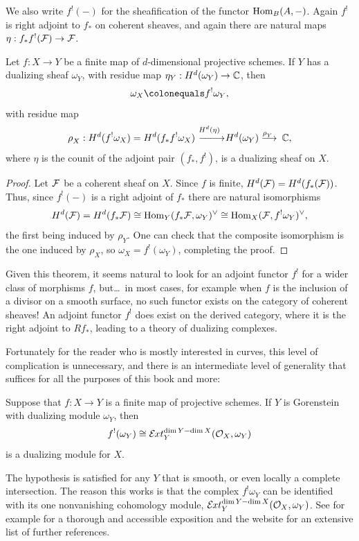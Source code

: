 We also write $f^{!}(-)$ for the sheafification of the functor
$\operatorname{Hom}_{B}(A,-)$. Again $f^{!}$ is right adjoint to $f_{*}$ on coherent
sheaves,
and again there are natural maps $\eta:f_{*}f^{!}({\mathcal F}) \to{\mathcal F}$.

\begin{theorem}\label{canonical as Hom}
\!Let $f{:}X{\to}Y$ be a finite map of $d$-dimensional projective schemes.
If $Y$ has a dualizing sheaf $\omega_{Y}$,
with residue map $\eta_{Y}: H^{d}(\omega_{Y}) \to {\mathbb C}$,
then
$$
\omega_{X} \colonequals f^{!}\omega_{Y},
$$
with residue map
$$
\rho^{}_{X}: H^{d}(f^{!}\omega_{X}) = H^{d}(f_{*}f^{!}\omega_{X}) \,\ruuto
{\!\!H^{d}(\eta)} H^{d}(\omega_{Y}) \ruto {\!\rho^{}_{Y}} \CC,
$$
where $\eta$ is the counit of the adjoint pair $(f_{*},f^{!})$, is a
dualizing sheaf on $X$.
\unif
\end{theorem}

\begin{proof}
Let ${\mathcal F}$ be a coherent sheaf on $X$. Since $f$ is finite,
$H^{d}({\mathcal F}) = H^{d}(f_{*}({\mathcal F}))$. Thus,
since $f^{!}(-)$ is a right adjoint of $f_{*}$ there are natural
isomorphisms
$$
H^{d}({\mathcal F}) = H^{d}(f_{*}{\mathcal F})
\cong
\operatorname{Hom}_{Y}(f_{*}{\mathcal F}, \omega_{Y})^{\vee} \cong
\operatorname{Hom}_{X}({\mathcal F}, f^{!}\omega_{Y})^{\vee},
$$
the first being
induced by $\rho^{}_{Y}$. One
can check that the composite
isomorphism is the one induced by $\rho^{}_{X}$, so $\omega_X =
f^{!}(\omega_{Y})$, completing the proof.
\end{proof}

\begin{fact}
Given this theorem, it seems natural to look for an adjoint functor
$f^{!}$ for a wider class of morphisms
$f$, but\dots\ in most cases, for example when $f$ is the inclusion of a
divisor on a smooth surface, no such functor exists on the category of
coherent sheaves!
An adjoint functor
$f^{!}$ does exist on the derived category, where it is the right adjoint
to $Rf_{*}$, leading to a theory
of dualizing complexes.

Fortunately for the reader who is mostly interested in curves, this
level of
complication is unnecessary, and there is an intermediate level of
generality that suffices
for all the purposes of this book and more:

\begin{theorem}\label{general adjunction}
Suppose that $f: X\to Y$ is a finite map of projective schemes. If $Y$ is
Gorenstein
%
with
dualizing module
%
$\omega_{Y}$, then
$$
f^{!}(\omega_{Y}) \cong \mathcal E\mkern-1mu xt^{\dim Y-\dim X}_{Y}({\mathcal O}_{X}, \omega_{Y})
$$
is a dualizing module for $X$.
\end{theorem}

The hypothesis is satisfied for any $Y$ that is smooth, or even 
locally a complete intersection.
%
The
reason this works is that the complex
$f^{!} \omega_{Y}$
can be identified with its one nonvanishing cohomology module,
$\mathcal E\mkern-1mu xt^{\dim Y-\dim X}_{Y}({\mathcal O}_{X}, \omega_{Y})$.
See for example \cite{AltmanKleiman} for a thorough and accessible
exposition and the website \cite{SixOperations} for an extensive
list of further references. 
\end{fact}

